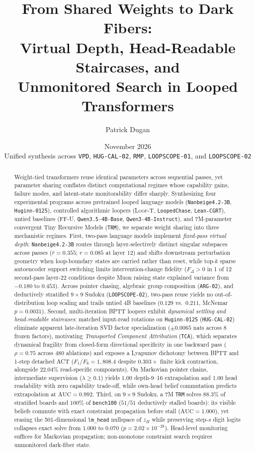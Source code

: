 \documentclass[10pt,letterpaper]{article}
\title{\bfseries From Shared Weights to Dark Fibers:\\[0.32em]
Virtual Depth, Head-Readable Staircases, and\\[0.14em]
Unmonitored Search in Looped Transformers}
\author{Patrick Dugan}
\date{November 2026\\[0.2em]\normalsize Unified synthesis across \texttt{VPD}, \texttt{HUG-CAL-02}, \texttt{RMP}, \texttt{LOOPSCOPE-01}, and \texttt{LOOPSCOPE-02}}
\newcommand{\LoopT}{\textsc{Loop-T}}
\newcommand{\FFU}{\textsc{FF-U}}
\begin{document}
\maketitle
\vspace{-0.65em}

\begin{abstract}
\noindent
Weight-tied transformers reuse identical parameters across sequential passes, yet parameter sharing conflates distinct computational regimes whose capability gains, failure modes, and latent-state monitorability differ sharply. Synthesizing four experimental programs across pretrained looped language models (\texttt{Nanbeige4.2-3B}, \texttt{Huginn-0125}), controlled algorithmic loopers (\LoopT, \texttt{LoopedChase}, \texttt{Lean-CGRT}), untied baselines (\FFU, \texttt{Qwen3.5-4B-Base}, \texttt{Qwen3-4B-Instruct}), and 7M-parameter convergent Tiny Recursive Models (\texttt{TRM}), we separate weight sharing into three mechanistic regimes. First, two-pass language models implement \emph{fixed-pass virtual depth}: \texttt{Nanbeige4.2-3B} routes through layer-selectively distinct singular subspaces across passes ($\bar{r}=0.355$; $r=0.085$ at layer 12) and shifts downstream perturbation geometry when loop-boundary states are carried rather than reset, while top-$k$ sparse autoencoder support switching limits intervention-change fidelity ($F_\Delta > 0$ in 1 of 12 second-pass layer-22 conditions despite Muon raising state explained variance from $-0.180$ to $0.453$). Across pointer chasing, algebraic group composition (\texttt{ARG-02}), and deductively stratified $9\times 9$ Sudoku (\texttt{LOOPSCOPE-02}), two-pass reuse yields no out-of-distribution loop scaling and trails untied 4B baselines ($0.129$ vs.\ $0.211$, McNemar $p=0.0031$). Second, multi-iteration BPTT loopers exhibit \emph{dynamical settling and head-readable staircases}: matched input-read rotations on \texttt{Huginn-0125} (\texttt{HUG-CAL-02}) eliminate apparent late-iteration SVD factor specialization ($\pm 0.0065$ nats across 8 frozen factors), motivating \emph{Transported Component Attribution} (\texttt{TCA}), which separates dynamical fragility from closed-form directional specificity in one backward pass ($\rho=0.75$ across 480 ablations) and exposes a Lyapunov dichotomy between BPTT and 1-step detached ACT ($F_1/F_6 = 1{,}808.4$ despite $0.303\times$ finite kick contraction, alongside $22.04\%$ read-specific components). On Markovian pointer chains, intermediate supervision ($\lambda \ge 0.1$) yields $1.00$ depth-9--16 extrapolation and $1.00$ head readability with zero capability trade-off, while own-head belief commutation predicts extrapolation at $\mathrm{AUC}=0.992$. Third, on $9\times 9$ Sudoku, a 7M \texttt{TRM} solves $88.3\%$ of stratified boards and $100\%$ of \texttt{bench100} ($51/51$ deductively stalled boards): its visible beliefs commute with exact constraint propagation before stall ($\mathrm{AUC}=1.000$), yet erasing the 501-dimensional \texttt{lm\_head} nullspace of $z_H$ while preserving step-$s$ digit logits collapses exact solve from $1.000$ to $0.070$ ($p=2.02\times 10^{-28}$). Head-level monitoring suffices for Markovian propagation; non-monotone constraint search requires unmonitored dark-fiber state.
\end{abstract}
\end{document}

